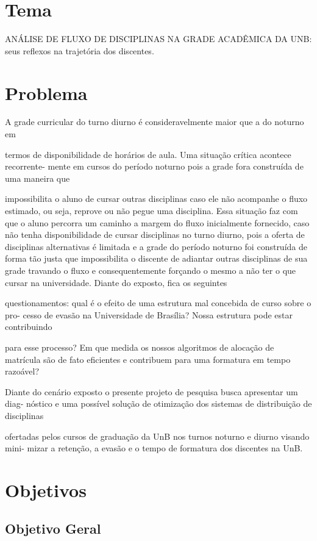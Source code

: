 \section{Tema}%
ANÁLISE DE FLUXO DE DISCIPLINAS NA GRADE ACADÊMICA DA UNB: seus reflexos na trajetória dos discentes.

\section{Problema}%
A grade curricular do turno diurno é consideravelmente maior que a do noturno em

termos de disponibilidade de horários de aula. Uma situação crítica acontece recorrente-
mente em cursos do período noturno pois a grade fora construída de uma maneira que

impossibilita o aluno de cursar outras disciplinas caso ele não acompanhe o fluxo estimado,
ou seja, reprove ou não pegue uma disciplina. Essa situação faz com que o aluno percorra
um caminho a margem do fluxo inicialmente fornecido, caso não tenha disponibilidade de
cursar disciplinas no turno diurno, pois a oferta de disciplinas alternativas é limitada e a
grade do período noturno foi construída de forma tão justa que impossibilita o discente
de adiantar outras disciplinas de sua grade travando o fluxo e consequentemente forçando
o mesmo a não ter o que cursar na universidade. Diante do exposto, fica os seguintes

questionamentos: qual é o efeito de uma estrutura mal concebida de curso sobre o pro-
cesso de evasão na Universidade de Brasília? Nossa estrutura pode estar contribuindo

para esse processo? Em que medida os nossos algoritmos de alocação de matrícula são de
fato eficientes e contribuem para uma formatura em tempo razoável?

Diante do cenário exposto o presente projeto de pesquisa busca apresentar um diag-
nóstico e uma possível solução de otimização dos sistemas de distribuição de disciplinas

ofertadas pelos cursos de graduação da UnB nos turnos noturno e diurno visando mini-
mizar a retenção, a evasão e o tempo de formatura dos discentes na UnB.

\section{Objetivos}%

\subsection{Objetivo Geral}

